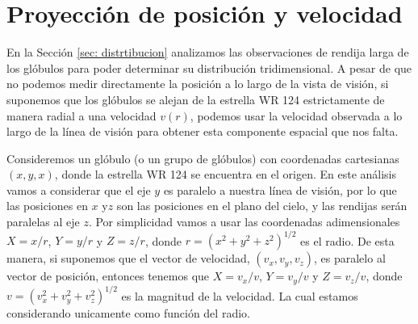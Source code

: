 \documentclass{book}
\begin{document}
\chapter{Proyección de posición y velocidad}\label{AP : PV}

En la Sección \ref{sec: distrtibucion} analizamos las observaciones de rendija larga de los glóbulos para poder determinar su distribución tridimensional. A pesar de que no podemos medir directamente la posición a lo largo de la vista de visión, si suponemos que los glóbulos se alejan de la estrella WR 124 estrictamente de manera radial a una velocidad $v(r)$, podemos usar la velocidad observada a lo largo de la línea de visión para obtener esta componente espacial que nos falta.


Consideremos un glóbulo (o un grupo de glóbulos) con coordenadas cartesianas $(x,y,x)$, donde la estrella WR 124 se encuentra en el origen. En este análisis vamos a considerar que el eje $y$ es paralelo a nuestra línea de visión, por lo que las posiciones en $x$ y$z$ son las posiciones en el plano del cielo, y las rendijas serán paralelas al eje $z$. Por simplicidad vamos a usar las coordenadas adimensionales $X=x/r$, $Y=y/r$ y $Z=z/r$, donde $r = \left( x^2+y^2+z^2\right)^{1/2}$ es el radio. De esta manera, si suponemos que el vector de velocidad, $(v_x,v_y,v_z)$, es paralelo al vector de posición, entonces tenemos que $X=v_x/v$, $Y=v_y/v$ y $Z=v_z/v$,
donde $v = \left( v_x^2+v_y^2+v_z^2\right)^{1/2}$ es la magnitud de la velocidad. La cual estamos considerando unicamente como función del radio.

\end{document}
